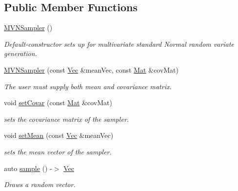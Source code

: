 \subsection*{Public Member Functions}
\begin{DoxyCompactItemize}
\item 
\hyperlink{classMVNSampler_a707349ecff1586c9477ffa399f014456}{M\+V\+N\+Sampler} ()
\begin{DoxyCompactList}\small\item\em Default-\/constructor sets up for multivariate standard Normal random variate generation. \end{DoxyCompactList}\item 
\hyperlink{classMVNSampler_a5ff0c96fe23f68ae910c11d6636aacf4}{M\+V\+N\+Sampler} (const \hyperlink{classMVNSampler_a409f73d7a66202b7ecff0f86e9afe3c1}{Vec} \&mean\+Vec, const \hyperlink{classMVNSampler_a008de968c985ee41633d53d25174701f}{Mat} \&cov\+Mat)
\begin{DoxyCompactList}\small\item\em The user must supply both mean and covariance matrix. \end{DoxyCompactList}\item 
void \hyperlink{classMVNSampler_a048a0f48cfb72718faf140e74e9a3ccb}{set\+Covar} (const \hyperlink{classMVNSampler_a008de968c985ee41633d53d25174701f}{Mat} \&cov\+Mat)
\begin{DoxyCompactList}\small\item\em sets the covariance matrix of the sampler. \end{DoxyCompactList}\item 
void \hyperlink{classMVNSampler_a842ee5e6925f50881b6628821a5de717}{set\+Mean} (const \hyperlink{classMVNSampler_a409f73d7a66202b7ecff0f86e9afe3c1}{Vec} \&mean\+Vec)
\begin{DoxyCompactList}\small\item\em sets the mean vector of the sampler. \end{DoxyCompactList}\item 
auto \hyperlink{classMVNSampler_a9c4d69cdbe841255a6fc1ff8531c4f4e}{sample} () -\/$>$ \hyperlink{classMVNSampler_a409f73d7a66202b7ecff0f86e9afe3c1}{Vec}
\begin{DoxyCompactList}\small\item\em Draws a random vector. \end{DoxyCompactList}\end{DoxyCompactItemize}
